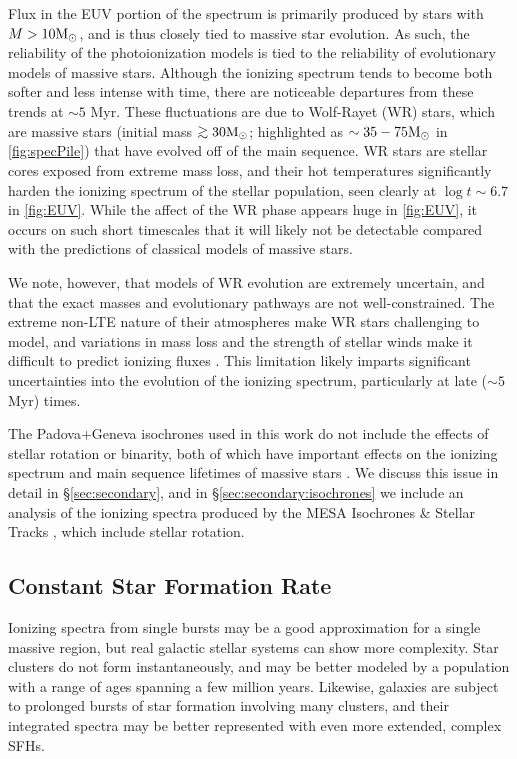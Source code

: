 Flux in the EUV portion of the spectrum is primarily produced by stars with $M > 10\mathrm{M_{\odot}}$, and is thus closely tied to massive star evolution. As such, the reliability of the photoionization models is tied to the reliability of evolutionary models of massive stars. Although the ionizing spectrum tends to become both softer and less intense with time, there are noticeable departures from these trends at ${\sim}5$ Myr. These fluctuations are due to Wolf-Rayet (WR) stars, which are massive stars (initial mass $\gtrsim 30\Msun$; highlighted as $\sim 35-75 \mathrm{M_{\odot}}$ in \ref{fig:specPile}) that have evolved off of the main sequence. WR stars are stellar cores exposed from extreme mass loss, and their hot temperatures significantly harden the ionizing spectrum of the stellar population, seen clearly at $\log t \sim 6.7$ in \ref{fig:EUV}. While the affect of the WR phase appears huge in \ref{fig:EUV}, it occurs on such short timescales that it will likely not be detectable compared with the predictions of classical models of massive stars.

We note, however, that models of WR evolution are extremely uncertain, and that the exact masses and evolutionary pathways are not well-constrained. The extreme non-LTE nature of their atmospheres make WR stars challenging to model, and variations in mass loss and the strength of stellar winds make it difficult to predict ionizing fluxes \citep[see review by][and references within]{Crowther07}. This limitation likely imparts significant uncertainties into the evolution of the ionizing spectrum, particularly at late (${\sim}5$ Myr) times.

The Padova+Geneva isochrones used in this work do not include the effects of stellar rotation or binarity, both of which have important effects on the ionizing spectrum and main sequence lifetimes of massive stars \citep[e.g.,][]{Levesque12, Eldridge+2012, Stanway+2016}. We discuss this issue in detail in \S\ref{sec:secondary}, and in \S\ref{sec:secondary:isochrones} we include an analysis of the ionizing spectra produced by the MESA Isochrones \& Stellar Tracks \citep[MIST,][]{Dotter16, Choi16}, which include stellar rotation.

\subsection{Constant Star Formation Rate}\label{sec:spectra:CSFH}

Ionizing spectra from single bursts may be a good approximation for a single massive \hii region, but real galactic stellar systems can show more complexity. Star clusters do not form instantaneously, and may be better modeled by a population with a range of ages spanning a few million years. Likewise, galaxies are subject to prolonged bursts of star formation involving many clusters, and their integrated spectra may be better represented with even more extended, complex SFHs.

